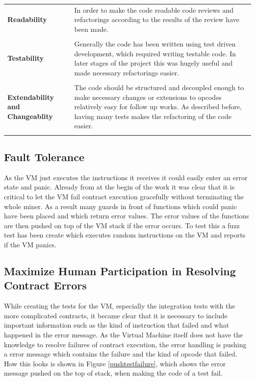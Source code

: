 \begin{tabular}[t]{ p{3cm} p{12.5cm}}
\raggedright
\textbf{Readability} &
In order to make the code readable code reviews and refactorings according to the results of the review have been made. \\ \\

\raggedright
\textbf{Testability} &
Generally the code has been written using test driven development, which required writing testable code. In later stages of the project this was hugely useful and made necessary refactorings easier. \\ \\
 
\raggedright
\textbf{Extendability and Changeablity} &
The code should be structured and decoupled enough to make necessary changes or extensions to opcodes relatively easy for follow up works. As described before, having many tests makes the refactoring of the code easier. \\ \\ 
\end{tabular}

\subsection{Fault Tolerance}
As the VM just executes the instructions it receives it could easily enter an error state and panic. Already from at the begin of the work it was clear that it is critical to let the VM fail contract execution gracefully without terminating the whole miner. As a result many guards in front of functions which could panic have been placed and which return error values. The error values of the functions are then pushed on top of the VM stack if the error occurs. To test this a fuzz test has been create which executes random instructions on the VM and reports if the VM panics. 

\subsection{Maximize Human Participation in Resolving Contract Errors}
While creating the tests for the VM, especially the integration tests with the more complicated contracts, it became clear that it is necessary to include important information such as the kind of instruction that failed and what happened in the error message. As the Virtual Machine itself does not have the knowledge to resolve failures of contract execution, the error handling is pushing a error message which contains the failure and the kind of opcode that failed. How this looks is shown in Figure \ref{pushtestfailure}, which shows the error message pushed on the top of stack, when making the code of a test fail.


